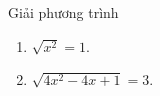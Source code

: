 \begin{bt}
	Giải phương trình
	\begin{multicols}{2}
		\begin{enumerate}
			\item $\sqrt{x^2}=1$.
			\item $\sqrt{4x^2-4x+1}=3$.
		\end{enumerate}
	\end{multicols}
\end{bt}


